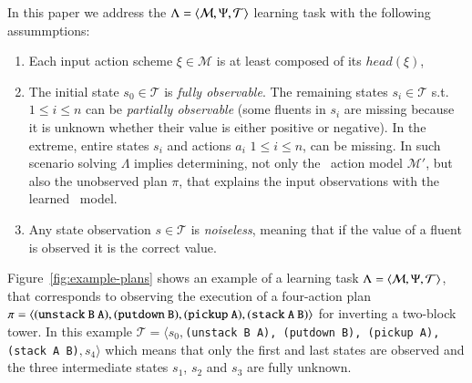 In this paper we address the $\Lambda={\langle \mathcal{M},\Psi,\mathcal{T} \rangle}$ learning task with the following assummptions:
\begin{enumerate}
\item Each input action scheme $\xi\in\mathcal{M}$ is at least composed of its $head(\xi)$,
\item The initial state $s_0\in\mathcal{T}$ is {\em fully observable}. The remaining states $s_i\in\mathcal{T}$ s.t. {\small $1\leq i\leq n$} can be {\em partially observable} (some fluents in $s_i$ are missing because it is unknown whether their value is either positive or negative). In the extreme, entire states $s_i$ and actions $a_i$ {\small $1\leq i\leq n$}, can be missing. In such scenario solving $\Lambda$ implies determining, not only the \strips\ action model $\mathcal{M}'$, but also the unobserved plan $\pi$, that explains the input observations with the learned \strips\ model.
\item Any state observation $s\in\mathcal{T}$ is {\em noiseless}, meaning that if the value of a fluent is observed it is the correct value. 
\end{enumerate}
  
Figure~\ref{fig:example-plans} shows an example of a learning task $\Lambda={\langle \mathcal{M},\Psi,\mathcal{T} \rangle}$, that corresponds to observing the execution of a four-action plan $\pi={\langle \small\tt (unstack\ B\ A), (putdown\ B), (pickup\ A), (stack\ A\ B) \rangle}$ for inverting a two-block tower. In this example $\mathcal{T}=\langle s_0,${\small\tt (unstack\ B\ A), (putdown\ B), (pickup\ A), (stack\ A\ B)}$,s_4\rangle$ which means that only the first and last states are observed and the three intermediate states $s_1$, $s_2$ and $s_3$ are fully unknown. 

